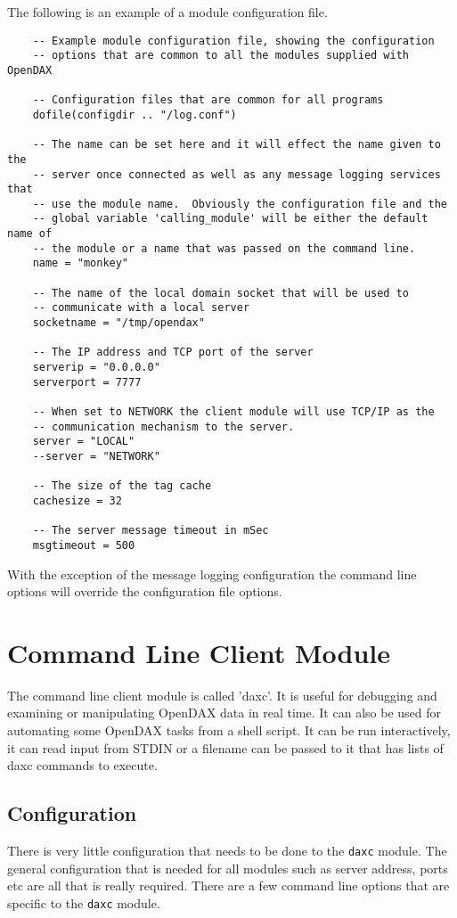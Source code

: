 	The following is an example of a module configuration file.

	\begin{verbatim}
	-- Example module configuration file, showing the configuration
	-- options that are common to all the modules supplied with OpenDAX

	-- Configuration files that are common for all programs
	dofile(configdir .. "/log.conf")

	-- The name can be set here and it will effect the name given to the
	-- server once connected as well as any message logging services that
	-- use the module name.  Obviously the configuration file and the
	-- global variable 'calling_module' will be either the default name of
	-- the module or a name that was passed on the command line.
	name = "monkey"

	-- The name of the local domain socket that will be used to
	-- communicate with a local server
	socketname = "/tmp/opendax"

	-- The IP address and TCP port of the server
	serverip = "0.0.0.0"
	serverport = 7777

	-- When set to NETWORK the client module will use TCP/IP as the
	-- communication mechanism to the server.
	server = "LOCAL"
	--server = "NETWORK"

	-- The size of the tag cache
	cachesize = 32

	-- The server message timeout in mSec
	msgtimeout = 500
	\end{verbatim}

	With the exception of the message logging configuration the command line options
	will override the configuration file options.

	\chapter{Command Line Client Module}
	The command line client module is called 'daxc'.  It is useful for debugging and
	examining or manipulating OpenDAX data in real time.  It can also be used for
	automating some OpenDAX tasks from a shell script.  It can be run interactively,
	it can read input from STDIN or a filename can be passed to it that has lists of
	daxc commands to execute.

	\section{Configuration}
	There is very little configuration that needs to be done to the \texttt{daxc}
	module.  The general configuration that is needed for all modules such as server
	address, ports etc are all that is really required.  There are a few command
	line options that are specific to the \texttt{daxc} module.


